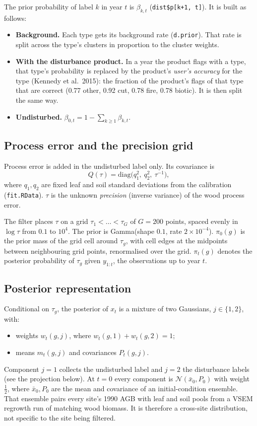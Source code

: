 \documentclass[11pt]{article}
\newcommand{\Norm}{\mathcal{N}}
\newcommand{\code}[1]{\texttt{#1}}
\begin{document}
The prior probability of label $k$ in year $t$ is $\beta_{k,t}$ (\code{dist\$p[k+1, t]}).
It is built as follows:
\begin{itemize}
  \item \textbf{Background.} Each type gets its background rate (\code{d.prior}). That rate
  is split across the type's clusters in proportion to the cluster weights.
  \item \textbf{With the disturbance product.} In a year the product flags with a type, that
  type's probability is replaced by the product's \emph{user's accuracy} for the type
  (Kennedy et al.\ 2015): the fraction of the product's flags of that type that are
  correct (0.77 other, 0.92 cut, 0.78 fire, 0.78 biotic). It is then split the same way.
  \item \textbf{Undisturbed.} $\beta_{0,t} = 1 - \sum_{k\ge1}\beta_{k,t}$.
\end{itemize}

\subsection{Process error and the precision grid}

Process error is added in the undisturbed label only. Its covariance is
\[
  Q(\tau) = \mathrm{diag}\big(q_1^2,\ q_2^2,\ \tau^{-1}\big),
\]
where $q_1, q_2$ are fixed leaf and soil standard deviations from the calibration
(\code{fit.RData}). $\tau$ is the unknown \emph{precision} (inverse variance) of the wood
process error.

The filter places $\tau$ on a grid $\tau_1 < \dots < \tau_G$ of $G = 200$ points,
spaced evenly in $\log\tau$ from $0.1$ to $10^4$. The prior is Gamma(shape $0.1$,
rate $2\times10^{-4}$). $\pi_0(g)$ is the prior mass of the grid cell around $\tau_g$,
with cell edges at the midpoints between neighbouring grid points, renormalised over the
grid. $\pi_t(g)$ denotes the posterior probability of $\tau_g$ given $y_{1:t}$, the
observations up to year $t$.

\subsection{Posterior representation}

Conditional on $\tau_g$, the posterior of $x_t$ is a mixture of two Gaussians,
$j \in \{1, 2\}$, with:
\begin{itemize}
  \item weights $w_t(g,j)$, where $w_t(g,1) + w_t(g,2) = 1$;
  \item means $m_t(g,j)$ and covariances $P_t(g,j)$.
\end{itemize}
Component $j = 1$ collects the undisturbed label and $j = 2$ the disturbance labels (see
the projection below). At $t = 0$ every component is $\Norm(\bar x_0, P_0)$ with weight
$\tfrac12$, where $\bar x_0, P_0$ are the mean and covariance of an initial-condition
ensemble. That ensemble pairs every site's 1990 AGB with leaf and soil pools from a VSEM
regrowth run of matching wood biomass. It is therefore a cross-site distribution, not
specific to the site being filtered.
\end{document}

